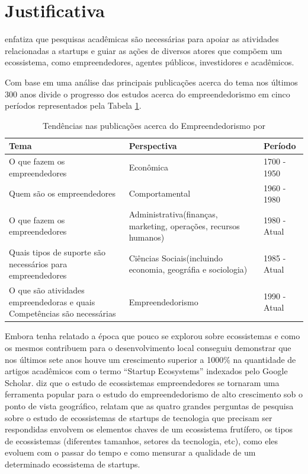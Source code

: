 \section{Justificativa}
\label{section:justificativa}

 enfatiza que pesquisas acadêmicas são necessárias para apoiar as atividades relacionadas a startups e guiar as ações de diversos atores que compõem um ecossistema, como empreendedores, agentes públicos, investidores e acadêmicos.

Com base em uma análise das principais publicações acerca do tema nos últimos 300 anos  divide o progresso dos estudos acerca do empreendedorismo em cinco períodos representados pela Tabela \ref{table:tendencias_nas_publicacoes_acerca_do_empreendedorismo}.

\begin{table}[!htb]
	\centering
	\begin{tabular}{ | p{6cm} | p{6cm} | p{3cm} | }
		\hline
		Tema & Perspectiva & Período \\ \hline
		O que fazem os empreendedores & Econômica & 1700 - 1950 \\ \hline
		Quem são os empreendedores & Comportamental & 1960 - 1980 \\ \hline
		O que fazem os empreendedores & Administrativa(finanças, marketing, operações, recursos humanos) & 1980 - Atual \\ \hline
		Quais tipos de suporte são necessários para empreendedores & Ciências Sociais(incluindo economia, geográfia e sociologia) & 1985 - Atual \\ \hline
		O que são atividades empreendedoras e quais Competências são necessárias & Empreendedorismo & 1990 - Atual \\ \hline
	\end{tabular}
	\caption{Tendências nas publicações acerca do Empreendedorismo por \cite{Filion1998}}
	\label{table:tendencias_nas_publicacoes_acerca_do_empreendedorismo}
\end{table}


Embora  tenha relatado a época que pouco se explorou sobre ecossistemas e como os mesmos contribuem para o desenvolvimento local  conseguiu demonstrar que nos últimos sete anos houve um crescimento superior a 1000\% na quantidade de artigos acadêmicos com o termo ``Startup Ecosystems'' indexados pelo Google Scholar.  diz que o estudo de ecossistemas empreendedores se tornaram uma ferramenta popular para o estudo do empreendedorismo de alto crescimento sob o ponto de vista geográfico,  relatam que as quatro grandes perguntas de pesquisa sobre o estudo de ecossistemas de startups de tecnologia que precisam ser respondidas envolvem os elementos chaves de um ecossistema frutífero, os tipos de ecossistemas (diferentes tamanhos, setores da tecnologia, etc), como eles evoluem com o passar do tempo e como mensurar a qualidade de um determinado ecossistema de startups. 

